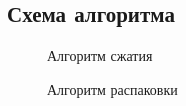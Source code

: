 
\subsection{Схема алгоритма}

\begin{figure}[h]
    \centering
    \def\svgwidth{0.6\textwidth}
    
    \caption{Алгоритм сжатия}
\end{figure}

\begin{figure}[h]
    \centering
    \def\svgwidth{0.7\textwidth}
    
    \caption{Алгоритм распаковки}
\end{figure}

